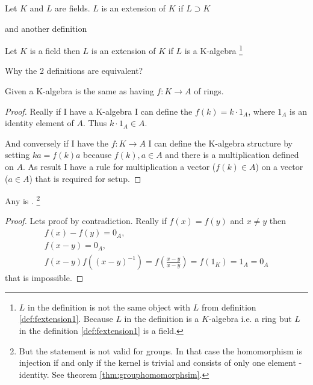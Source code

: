 \begin{definition}
  Let $K$ and $L$ are fields.
  $L$ is an extension of $K$ if $L \supset K$
  \label{def:fextension1}
\end{definition}
and another definition
\begin{definition}
  Let $K$ is a field then
  $L$ is an extension of $K$ if $L$ is a K-algebra
  \footnote{
    $L$ in the definition is not the same object with $L$ from
    definition \ref{def:fextension1}. Because $L$ in the definition is
    a $K$-algebra i.e. a ring but $L$ in the definition
    \ref{def:fextension1} is a field. 
  }
  \label{def:fextension2}
\end{definition}
Why the 2 definitions are equivalent?

\begin{lemma}
  Given a K-algebra is the same as
  having  $f: K \rightarrow A$ of rings.
  \begin{proof}
    Really if I have a K-algebra I can define the
     $f(k) = k \cdot 1_A$, where $1_A$ is an
    identity element of $A$. Thus $k \cdot 1_A \in A$.

    And conversely if I have the 
    $f: K \rightarrow A$
    I can define the K-algebra structure by setting
    $k a = f(k) a$ because $f(k), a \in A$ and there is a multiplication
    defined on $A$. As result I have a rule for multiplication a vector
    ($f(k) \in A$) on a vector ($a \in A$) that is required for
     setup.
  \end{proof}
  \label{lem:lec1_homkalgebra}
\end{lemma}

\begin{lemma}
  Any  is
  .
  \footnote{
    But the statement is not valid for groups. In that case the
    homomorphism is injection if and only if the 
    kernel is trivial and consists of only one element - identity.
    See theorem \ref{thm:grouphomomorphsim}.
  }
  \label{lem:lec1_homomorphism_is_injection}
  \begin{proof}
    Lets proof by contradiction.
    Really if $f(x) = f(y)$ and $x \ne y$ then
    \begin{eqnarray}
      f(x) - f(y) = 0_A,
      \nonumber \\
      f(x - y) = 0_A,
      \nonumber \\
      f(x - y) f(\left(x - y\right)^{-1}) =
      f\left(\frac{x - y}{x - y}\right) = f(1_K) = 1_A = 0_A
      \nonumber
    \end{eqnarray}
    that is impossible.
  \end{proof}  
\end{lemma}

